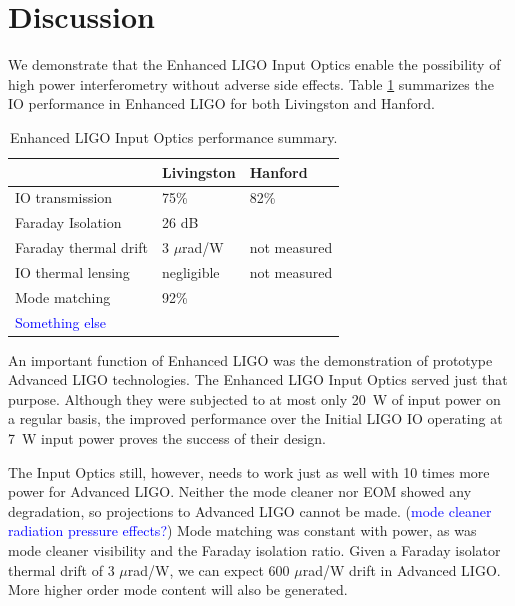 \section{Discussion}
\label{sec:aLIGO}
We demonstrate that the Enhanced LIGO Input Optics enable the
possibility of high power interferometry without adverse side
effects. Table \ref{tab:summary} summarizes the IO performance in
Enhanced LIGO for both Livingston and Hanford.
\begin{table}
\caption{Enhanced LIGO Input Optics performance summary.}
\centering
\begin{tabular}{l l l}
 & Livingston & Hanford \\
\hline\hline
IO transmission & 75\% & 82\% \\
Faraday Isolation & 26 dB & \\
Faraday thermal drift & 3 $\mu$rad/W & not measured \\
IO thermal lensing & negligible & not measured \\
Mode matching & 92\% & \\
\textcolor{blue}{Something else} & & \\
\hline
\end{tabular}
\label{tab:summary}
\end{table}

An important function of Enhanced LIGO was the demonstration of
prototype Advanced LIGO technologies. The Enhanced LIGO Input Optics
served just that purpose. Although they were subjected to at most only
20~W of input power on a regular basis, the improved performance
over the Initial LIGO IO operating at 7~W input power proves the
success of their design. 

The Input Optics still, however, needs to work just as well with 10
times more power for Advanced LIGO. Neither the mode cleaner nor EOM
showed any degradation, so projections to Advanced LIGO cannot be
made. (\textcolor{blue}{mode cleaner radiation pressure effects?})
Mode matching was constant with power, as was mode cleaner visibility
and the Faraday isolation ratio. Given a Faraday isolator thermal
drift of 3 $\mu$rad/W, we can expect 600 $\mu$rad/W
drift in Advanced LIGO. More higher order mode content will also be
generated.